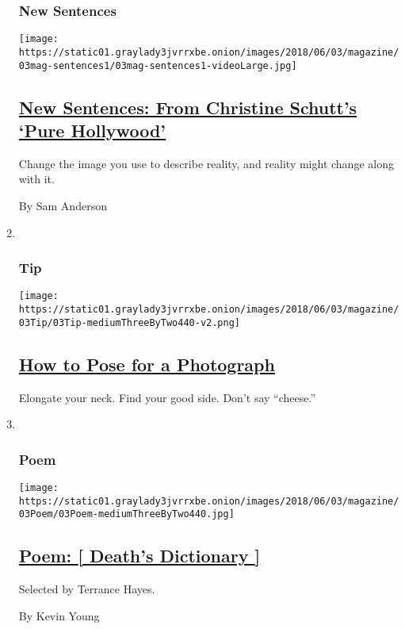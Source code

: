\begin{enumerate}
{  \subsubsection{New Sentences}\label{new-sentences}}

  \texttt{[image: https://static01.graylady3jvrrxbe.onion/images/2018/06/03/magazine/03mag-sentences1/03mag-sentences1-videoLarge.jpg]}

  \hypertarget{new-sentences-from-christine-schutts-pure-hollywood}{%
  \subsection{\texorpdfstring{\href{/2018/05/30/magazine/new-sentences-from-christine-schutts-pure-hollywood.html}{New
  Sentences: From Christine Schutt's `Pure
  Hollywood'}}{New Sentences: From Christine Schutt's `Pure Hollywood'}}\label{new-sentences-from-christine-schutts-pure-hollywood}}

  Change the image you use to describe reality, and reality might change
  along with it.

  By Sam Anderson
\item ~
  \hypertarget{tip}{%
  \subsubsection{Tip}\label{tip}}

  \texttt{[image: https://static01.graylady3jvrrxbe.onion/images/2018/06/03/magazine/03Tip/03Tip-mediumThreeByTwo440-v2.png]}

  \hypertarget{how-to-pose-for-a-photograph}{%
  \subsection{\texorpdfstring{\href{/2018/05/30/magazine/how-to-pose-for-a-photograph.html}{How
  to Pose for a
  Photograph}}{How to Pose for a Photograph}}\label{how-to-pose-for-a-photograph}}

  Elongate your neck. Find your good side. Don't say ``cheese.''
\item ~
  \hypertarget{poem}{%
  \subsubsection{Poem}\label{poem}}

  \texttt{[image: https://static01.graylady3jvrrxbe.onion/images/2018/06/03/magazine/03Poem/03Poem-mediumThreeByTwo440.jpg]}

  \hypertarget{poem--deaths-dictionary-}{%
  \subsection{\texorpdfstring{\href{/2018/05/31/magazine/poem-deaths-dictionary.html}{Poem:
  {[} Death's Dictionary
  {]}}}{Poem: {[} Death's Dictionary {]}}}\label{poem--deaths-dictionary-}}

  Selected by Terrance Hayes.

  By Kevin Young
\end{enumerate}

